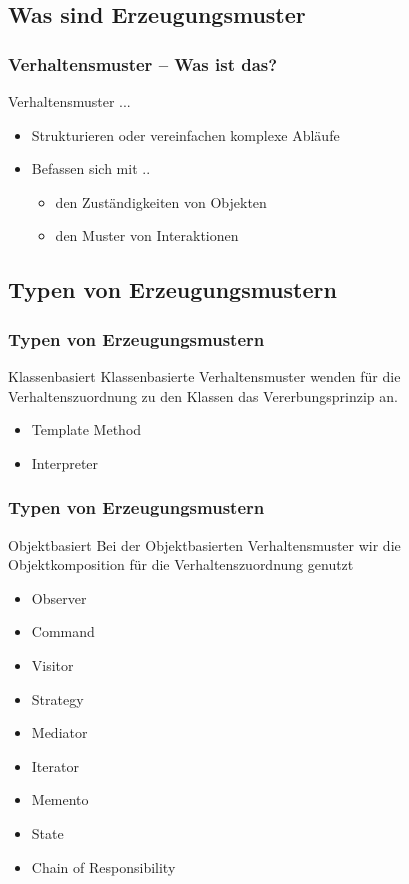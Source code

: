 \subsection{Was sind Erzeugungsmuster}


\begin{frame}
	\frametitle{Verhaltensmuster -- Was ist das?}
	\begin{block}{Verhaltensmuster ...}
	\begin{itemize}
		\item Strukturieren oder vereinfachen komplexe Abläufe
		\item Befassen sich mit ..
		\begin{itemize}
			\item den Zuständigkeiten von Objekten
			\item den Muster von Interaktionen
		\end{itemize}
	\end{itemize}
	\end{block}	
\end{frame}


\subsection{Typen von Erzeugungsmustern}
\begin{frame}
	\frametitle{Typen von Erzeugungsmustern}
	\begin{block}{Klassenbasiert}
		Klassenbasierte Verhaltensmuster wenden für die Verhaltenszuordnung zu den Klassen das Vererbungsprinzip an. 
		\begin{itemize}
			\item Template Method
			\item Interpreter
		\end{itemize} 	
	\end{block}
\end{frame}

\begin{frame}
	\frametitle{Typen von Erzeugungsmustern}
	\begin{block}{Objektbasiert}
		Bei der Objektbasierten Verhaltensmuster wir die Objektkomposition für die Verhaltenszuordnung genutzt
				\begin{itemize}
					\item \alert<1-> {Observer}
					\item \alert<1-> {Command}
					\item \alert<1-> {Visitor}
					\item Strategy			
					\item Mediator
					\item Iterator
					\item Memento 
					\item State
					\item Chain of Responsibility
				\end{itemize}	
	\end{block}
\end{frame}
